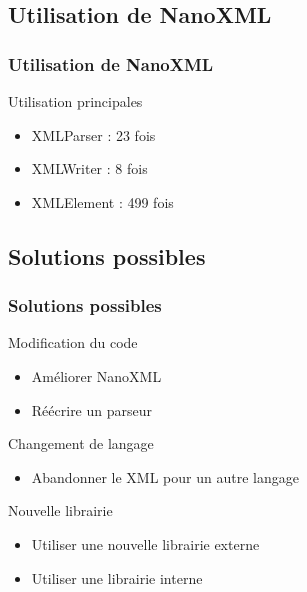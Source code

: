 \subsection{Utilisation de NanoXML}
\begin{frame}\frametitle{Utilisation de NanoXML}
\begin{beamerboxesrounded}[shadow=true]{Utilisation principales}
 \begin{itemize}
  \item XMLParser : 23 fois
  \item XMLWriter : 8 fois
  \item XMLElement : 499 fois
 \end{itemize}
\end{beamerboxesrounded}
\end{frame}
\subsection{Solutions possibles}
\begin{frame}\frametitle{Solutions possibles}
\begin{minipage}[c]{.46\linewidth}
\begin{beamerboxesrounded}[shadow=true]{Modification du code}
\begin{itemize}
	\item Améliorer NanoXML
	\item Réécrire un parseur
\end{itemize}
\end{beamerboxesrounded}
\end{minipage}
\hfill
\begin{minipage}[c]{.46\linewidth}
\begin{beamerboxesrounded}[shadow=true]{Changement de langage}
\begin{itemize}
	\item Abandonner le XML pour un autre langage
\end{itemize}
\end{beamerboxesrounded}
\end{minipage}
\vfill
\hfil
\begin{minipage}[c]{.8\linewidth}
\begin{beamerboxesrounded}[shadow=true]{Nouvelle librairie}
\begin{itemize}
	\item Utiliser une nouvelle librairie externe
	\item Utiliser une librairie interne
\end{itemize}
\end{beamerboxesrounded}
\end{minipage}
\end{frame}
